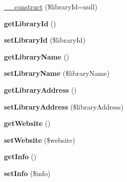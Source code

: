 \begin{DoxyCompactItemize}
\item 
\hyperlink{classLibrary_a448367379e1917a080692b9f7d09b2af}{\_\-\_\-construct} (\$libraryId=null)
\item 
\hypertarget{classLibrary_a34d5adadf5e40827701eb60578f7a0f3}{
{\bfseries getLibraryId} ()}
\label{classLibrary_a34d5adadf5e40827701eb60578f7a0f3}

\item 
\hypertarget{classLibrary_a3c6fc6ea2264853d5b429b8efccc28f3}{
{\bfseries setLibraryId} (\$libraryId)}
\label{classLibrary_a3c6fc6ea2264853d5b429b8efccc28f3}

\item 
\hypertarget{classLibrary_a659f8b8b2794c0dc94433d5031537cd7}{
{\bfseries getLibraryName} ()}
\label{classLibrary_a659f8b8b2794c0dc94433d5031537cd7}

\item 
\hypertarget{classLibrary_aaa6854a276ca6f3205f9f50765e58b3e}{
{\bfseries setLibraryName} (\$libraryName)}
\label{classLibrary_aaa6854a276ca6f3205f9f50765e58b3e}

\item 
\hypertarget{classLibrary_ad1cb79a230bdc75537af95c9dd2e8e68}{
{\bfseries getLibraryAddress} ()}
\label{classLibrary_ad1cb79a230bdc75537af95c9dd2e8e68}

\item 
\hypertarget{classLibrary_a55af3acbe5cc36d495ef5eae6709e73a}{
{\bfseries setLibraryAddress} (\$libraryAddress)}
\label{classLibrary_a55af3acbe5cc36d495ef5eae6709e73a}

\item 
\hypertarget{classLibrary_a14e025adb3ccebbbde3392a1b238c352}{
{\bfseries getWebsite} ()}
\label{classLibrary_a14e025adb3ccebbbde3392a1b238c352}

\item 
\hypertarget{classLibrary_a1111c98cd08c2aca57e9d312aa4c7005}{
{\bfseries setWebsite} (\$website)}
\label{classLibrary_a1111c98cd08c2aca57e9d312aa4c7005}

\item 
\hypertarget{classLibrary_a48bb994e851407e81e703e78a4f97b16}{
{\bfseries getInfo} ()}
\label{classLibrary_a48bb994e851407e81e703e78a4f97b16}

\item 
\hypertarget{classLibrary_ae9a047ee6e26b0eda6df0659400f8f5f}{
{\bfseries setInfo} (\$info)}
\label{classLibrary_ae9a047ee6e26b0eda6df0659400f8f5f}

\end{DoxyCompactItemize}
